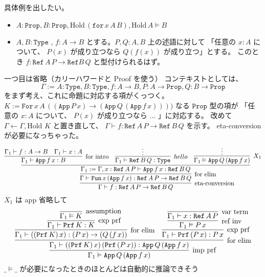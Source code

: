具体例を出したい。
\begin{itemize}
  \item \(A : \texttt{Prop} , B : \texttt{Prop} , \text{Hold} \, (\texttt{for} \, x \, A \, B) , \text{Hold} \, A \vDash B\)
  \item \(A , B : \texttt{Type}\) , \(f : A \to B\) とする。\(P , Q : A , B\) 上の述語に対して 「任意の \(x : A\) について、 \(P(x)\) が成り立つなら \(Q(f(x))\) が成り立つ」とする。
  このとき \(f : \texttt{Ref} \, A \, P \to \texttt{Ref} B \, Q \) と型付けられるはず。
\end{itemize}
一つ目は省略（カリーハワードと Proof を使う）
コンテキストとしては、
  \[\Gamma := A : \texttt{Type} , B : \texttt{Type} , f : A \to B , P : A \to \texttt{Prop} , Q : B \to \texttt{Prop}\]
をまず考え、これに命題に対応する項がくっつく。
\(K := \texttt{For} \, x \, A \, ((\texttt{App} \, P \, x) \to (\texttt{App} \, Q \, (\texttt{App} \, f \, x))))\) なる \(\texttt{Prop}\) 型の項が 「任意の \(x : A\) について、 \(P(x)\) が成り立つなら \(\ldots\) 」に対応する。
改めて \(\Gamma \leftarrow \Gamma , \text{Hold } K\) と置き直して、 \(\Gamma \vdash f : \texttt{Ref} \, A \, P \to \texttt{Ref} \, B \, Q\) を示す。
eta-conversion が必要になっちゃった。
\[
  \infer[\text{eta-conversion}]
  {\Gamma \vdash f : \texttt{Ref} \, A \, P \to \texttt{Ref} \, B \, Q}{
    \infer[\text{for elim}]
    {\Gamma \vdash \texttt{Fun} \, x \, (\texttt{App} \, f \, x) : \texttt{Ref} \, A \, P \to \texttt{Ref} \, B \, Q}{
      \infer[]
      {\Gamma_1 := \Gamma , x : \texttt{Ref} \, A \, P \vdash \texttt{App} \, f \, x : \texttt{Ref} \, B \, Q}{
        \infer[\text{for intro}]
        {\Gamma_1 \vdash \texttt{App} \, f \, x : B}{
          \Gamma_1 \vdash f : A \to B & \Gamma_1 \vdash x : A} &
        \infer[hello]
        {\Gamma_1 \vdash \texttt{Ref} \, B \, Q : \texttt{Type} }{\vdots} &
        \infer[X_1]
        {\Gamma_1 \vDash \texttt{App} \, Q \, (\texttt{App} \, f \, x)}{
        \vdots
        }
      }
  }}
\]
\(X_1\) は app 省略して
\[
  \infer[\text{imp prf}]
  {\Gamma_1 \vDash \texttt{App} \, Q \, (\texttt{App} \, f \, x)}{
    \infer[\text{for elim}]
    {\Gamma_1 \vdash ((\texttt{Prf} \, K) \, x) \, (\texttt{Prf} \, (P \, x)) : \texttt{App} \, Q \, (\texttt{App} \, f \, x)}{
      \infer[\text{for elim}]{\Gamma_1 \vdash ((\texttt{Prf} \, K) \, x) : (P \, x) \to (Q \, (f \, x))}{
        \infer[\text{exp prf}]{\Gamma_1 \vdash \texttt{Prf} \, K : K}{
          \infer[\text{assumption}]{\Gamma_1 \vDash K}{}}
      } &
      \infer[\text{exp prf}]{\Gamma_1 \vdash \texttt{Prf} \, (P \, x) : P \, x}{
        \infer[\text{ref inv}]{\Gamma_1 \vDash P \, x}{
          \infer[\text{var term}]{\Gamma_1 \vdash x : \texttt{Ref} \, A \, P}{}}
    }
    }
  }
\]
\(\_ \vDash \_ \) が必要になったときのほとんどは自動的に推論できそう